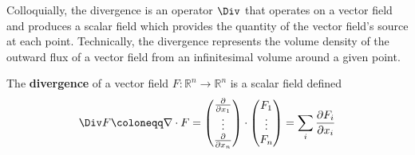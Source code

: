  Colloquially, the divergence is an operator $\Div$ that operates on a vector field and produces a scalar field which provides the quantity of the vector field's source at each point. Technically, the divergence represents the volume density of the outward flux of a vector field from an infinitesimal volume around a given point. 

  \begin{definition}[Divergence]
		The \textbf{divergence} of a vector field $F: \mathbb{R}^n \longrightarrow \mathbb{R}^n$ is a scalar field defined 
		\begin{equation}
			\Div F \coloneqq \nabla \cdot F = \begin{pmatrix} \frac{\partial}{\partial x_1} \\ \vdots \\ \frac{\partial}{\partial x_n} \end{pmatrix} \cdot \begin{pmatrix} F_1 \\ \vdots \\ F_n \end{pmatrix} = \sum_i \frac{\partial F_i}{\partial x_i}
		\end{equation}


\end{definition}
